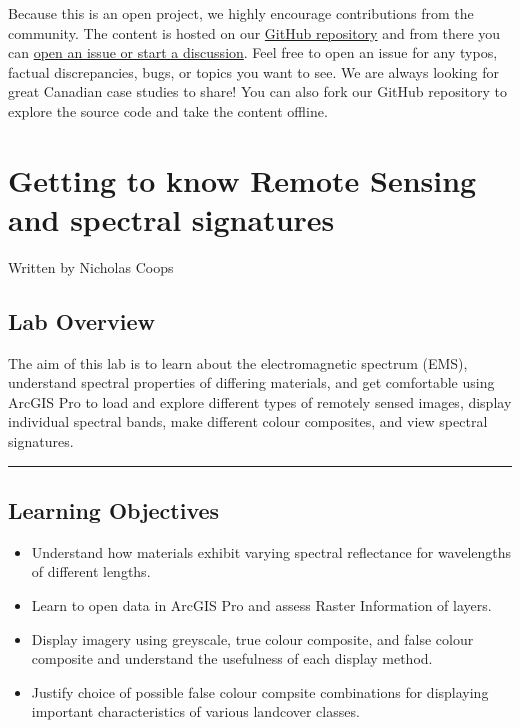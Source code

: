 \documentclass[
]{book}
\providecommand{\tightlist}{%
  \setlength{\itemsep}{0pt}\setlength{\parskip}{0pt}}
\begin{document}
Because this is an open project, we highly encourage contributions from the community. The content is hosted on our \href{https://github.com/ubc-geomatics-community-of-practice/FRST538-Advanced-Geomatics-for-Natural-Resource-Management}{GitHub repository} and from there you can \href{https://github.com/ubc-geomatics-community-of-practice/FRST538-Advanced-Geomatics-for-Natural-Resource-Management/issues/new}{open an issue or start a discussion}. Feel free to open an issue for any typos, factual discrepancies, bugs, or topics you want to see. We are always looking for great Canadian case studies to share! You can also fork our GitHub repository to explore the source code and take the content offline.

\hypertarget{spectral-signatures}{%
\chapter{Getting to know Remote Sensing and spectral signatures}\label{spectral-signatures}}

Written by
Nicholas Coops

\hypertarget{lab-overview}{%
\section*{Lab Overview}\label{lab-overview}}

The aim of this lab is to learn about the electromagnetic spectrum (EMS), understand spectral properties of differing materials, and get comfortable using ArcGIS Pro to load and explore different types of remotely sensed images, display individual spectral bands, make different colour composites, and view spectral signatures.

\begin{center}\rule{0.5\linewidth}{0.5pt}\end{center}

\hypertarget{learning-objectives}{%
\section*{Learning Objectives}\label{learning-objectives}}

\begin{itemize}
\tightlist
\item
  Understand how materials exhibit varying spectral reflectance for wavelengths of different lengths.
\item
  Learn to open data in ArcGIS Pro and assess Raster Information of layers.
\item
  Display imagery using greyscale, true colour composite, and false colour composite and understand the usefulness of each display method.
\item
  Justify choice of possible false colour compsite combinations for displaying important characteristics of various landcover classes.
\end{itemize}
\end{document}
